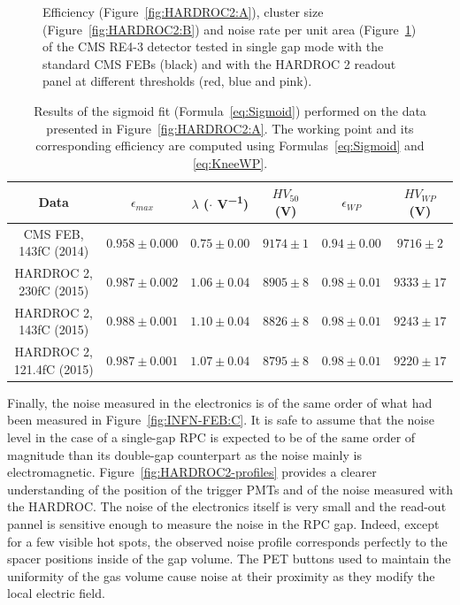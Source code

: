 \begin{figure}[H]
\begin{subfigure}{\linewidth}
			\caption{\label{fig:HARDROC2:C}}
		\end{subfigure}
		\caption{\label{fig:HARDROC2} Efficiency (Figure~\ref{fig:HARDROC2:A}), cluster size (Figure~\ref{fig:HARDROC2:B}) and noise rate per unit area (Figure~\ref{fig:HARDROC2:C}) of the CMS RE4-3 detector tested in single gap mode with the standard CMS FEBs (black) and with the HARDROC 2 readout panel at different thresholds (red, blue and pink).}
	\end{figure}
	
\newpage
	
	\begin{table}[H]
		\caption{\label{tab:HARDROC2} Results of the sigmoid fit (Formula~\ref{eq:Sigmoid}) performed on the data presented in Figure~\ref{fig:HARDROC2:A}. The working point and its corresponding efficiency are computed using Formulas~\ref{eq:Sigmoid} and \ref{eq:KneeWP}.}
		\footnotesize
		\begin{tabular}{|c|c|c|c|c|c|}
			\hline
			Data & $\epsilon_{max}$ & $\lambda$ ($\cdot$\Ord{-2} \si{V^{-1}}) & $HV_{50}$ (\si{V}) & $\epsilon_{WP}$ & $HV_{WP}$ (\si{V}) \\ 
			\hline
			CMS FEB, 143fC (2014) & $0.958 \pm 0.000$ & $0.75 \pm 0.00$ & $9174 \pm 1$ & $0.94 \pm 0.00$ & $9716 \pm 2$\\ 
			\hline
			HARDROC 2, 230fC (2015) & $0.987 \pm 0.002$ & $1.06 \pm 0.04$ & $8905 \pm 8$ & $0.98 \pm 0.01$ & $9333 \pm 17$\\ 
			\hline
			HARDROC 2, 143fC (2015) & $0.988 \pm 0.001$ & $1.10 \pm 0.04$ & $8826 \pm 8$ & $0.98 \pm 0.01$ & $9243 \pm 17$\\ 
			\hline
			HARDROC 2, 121.4fC (2015) & $0.987 \pm 0.001$ & $1.07 \pm 0.04$ & $8795 \pm 8$ & $0.98 \pm 0.01$ & $9220 \pm 17$\\ 
			\hline
		\end{tabular}
	\end{table}
	
	Finally, the noise measured in the electronics is of the same order of what had been measured in Figure~\ref{fig:INFN-FEB:C}. It is safe to assume that the noise level in the case of a single-gap RPC is expected to be of the same order of magnitude than its double-gap counterpart as the noise mainly is electromagnetic. Figure~\ref{fig:HARDROC2-profiles} provides a clearer understanding of the position of the trigger PMTs and of the noise measured with the HARDROC. The noise of the electronics itself is very small and the read-out pannel is sensitive enough to measure the noise in the RPC gap. Indeed, except for a few visible hot spots, the observed noise profile corresponds perfectly to the spacer positions inside of the gap volume. The PET buttons used to maintain the uniformity of the gas volume cause noise at their proximity as they modify the local electric field.
	 
